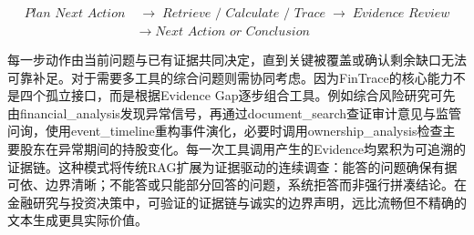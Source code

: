 \[
\begin{aligned}
\textit{Plan Next Action}
&\;\rightarrow\;
\textit{Retrieve / Calculate / Trace}
\;\rightarrow\;
\textit{Evidence Review} \\
&\;\rightarrow\;
\textit{Next Action or Conclusion}
\end{aligned}
\]

每一步动作由当前问题与已有证据共同决定，直到关键被覆盖或确认剩余缺口无法可靠补足。对于需要多工具的综合问题则需协同考虑。因为FinTrace的核心能力不是四个孤立接口，而是根据Evidence Gap逐步组合工具。例如综合风险研究可先由financial\_analysis发现异常信号，再通过document\_search查证审计意见与监管问询，使用event\_timeline重构事件演化，必要时调用ownership\_analysis检查主要股东在异常期间的持股变化。每一次工具调用产生的Evidence均累积为可追溯的证据链。这种模式将传统RAG扩展为证据驱动的连续调查：能答的问题确保有据可依、边界清晰；不能答或只能部分回答的问题，系统拒答而非强行拼凑结论。在金融研究与投资决策中，可验证的证据链与诚实的边界声明，远比流畅但不精确的文本生成更具实际价值。
